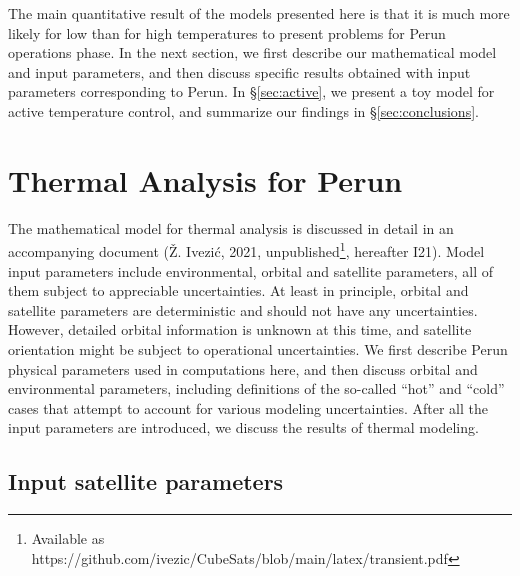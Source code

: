 \documentclass[]{aastex62}
\begin{document}
The main quantitative result of the models presented here is that it is much more likely 
for low than for high temperatures to present problems for Perun operations phase. 
In the next section, we first describe our mathematical model and input parameters, and then 
discuss specific results obtained with input parameters corresponding to Perun. In \S\ref{sec:active},
we present a toy model for active temperature control, and summarize our findings in \S\ref{sec:conclusions}. 



\section{Thermal Analysis for Perun} 

The mathematical model for thermal analysis is discussed in detail in an accompanying document 
(\v{Z}. Ivezi\'{c}, 2021, unpublished\footnote{Available as https://github.com/ivezic/CubeSats/blob/main/latex/transient.pdf}, 
hereafter I21).  
Model input parameters include environmental, orbital and satellite parameters, all of them
subject to appreciable uncertainties. At least in principle, orbital and satellite parameters 
are deterministic and should not have any uncertainties. However, detailed orbital information
is unknown at this time, and satellite orientation might be subject to 
operational uncertainties. We first describe Perun physical parameters used in computations
here, and then discuss orbital and environmental parameters, including definitions of the 
so-called ``hot'' and ``cold'' cases that attempt to account for various modeling uncertainties. 
After all the input parameters are introduced, we discuss the results of thermal modeling. 
 

\subsection{Input satellite parameters}
\end{document}
